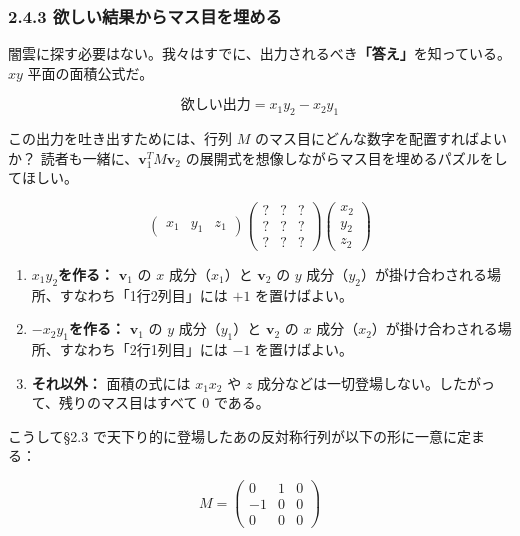 \documentclass[a4paper,12pt,openany]{book}
\providecommand{\tightlist}{%
  \setlength{\itemsep}{0pt}\setlength{\parskip}{0pt}}
\begin{document}
\hypertarget{ux6b32ux3057ux3044ux7d50ux679cux304bux3089ux30deux30b9ux76eeux3092ux57cbux3081ux308b}{%
\subsubsection{2.4.3
欲しい結果からマス目を埋める}\label{ux6b32ux3057ux3044ux7d50ux679cux304bux3089ux30deux30b9ux76eeux3092ux57cbux3081ux308b}}

闇雲に探す必要はない。我々はすでに、出力されるべき\textbf{「答え」}を知っている。
\(xy\) 平面の面積公式だ。

\[\text{欲しい出力} = x_1 y_2 - x_2 y_1\]

この出力を吐き出すためには、行列 \(M\)
のマス目にどんな数字を配置すればよいか？
読者も一緒に、\(\mathbf{v}_1^T M \mathbf{v}_2\)
の展開式を想像しながらマス目を埋めるパズルをしてほしい。

\[
\begin{pmatrix} x_1 & y_1 & z_1 \end{pmatrix}
\begin{pmatrix}
  ? & ? & ? \\
  ? & ? & ? \\
  ? & ? & ?
\end{pmatrix}
\begin{pmatrix} x_2 \\ y_2 \\ z_2 \end{pmatrix}
\]

\begin{enumerate}
\def\labelenumi{\arabic{enumi}.}
\tightlist
\item
  \(x_1 y_2\)\textbf{を作る：} \(\mathbf{v}_1\) の \(x\)
  成分（\(x_1\)）と \(\mathbf{v}_2\) の \(y\)
  成分（\(y_2\)）が掛け合わされる場所、すなわち「1行2列目」には \(+1\)
  を置けばよい。
\item
  \(-x_2 y_1\)\textbf{を作る：} \(\mathbf{v}_1\) の \(y\)
  成分（\(y_1\)）と \(\mathbf{v}_2\) の \(x\)
  成分（\(x_2\)）が掛け合わされる場所、すなわち「2行1列目」には \(-1\)
  を置けばよい。
\item
  \textbf{それ以外：} 面積の式には \(x_1 x_2\) や \(z\)
  成分などは一切登場しない。したがって、残りのマス目はすべて \(0\)
  である。
\end{enumerate}

こうして§2.3
で天下り的に登場したあの反対称行列が以下の形に一意に定まる：

\[
M = \begin{pmatrix}
  0 & 1 & 0 \\
  -1 & 0 & 0 \\
  0 & 0 & 0
\end{pmatrix}
\]
\end{document}
